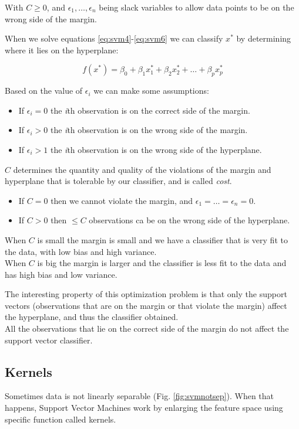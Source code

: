 With $C \ge 0$, and $\epsilon_1, \dots, \epsilon_n$ being slack variables to allow data points to be on the wrong side of the margin.

When we solve equations \ref{eq:svm4}-\ref{eq:svm6} we can classify $x^*$ by determining where it lies on the hyperplane:

\begin{equation} \label{eq:svm7}
f(x^*) = \beta_0 + \beta_1 x_{1}^* + \beta_2 x_{2}^* + \dots + \beta_p x_{p}^*
\end{equation}

Based on the value of $\epsilon_i$ we can make some assumptions:
\begin{itemize}[noitemsep]
	\item If $\epsilon_i = 0$ the \textit{i}th observation is on the correct side of the margin.
	\item If $\epsilon_i > 0$ the \textit{i}th observation is on the wrong side of the margin.
	\item If $\epsilon_i > 1$ the \textit{i}th observation is on the wrong side of the hyperplane.
\end{itemize}

$C$ determines the quantity and quality of the violations of the margin and hyperplane that is tolerable by our classifier, and is called \textit{cost}.
\begin{itemize}[noitemsep]
	\item If $C = 0$ then we cannot violate the margin, and $\epsilon_1 = \dots = \epsilon_n = 0$.
	\item If $C > 0$ then $\le C$ observations ca be on the wrong side of the hyperplane.
\end{itemize} 

When $C$ is small the margin is small and we have a classifier that is very fit to the data, with low bias and high variance. \\
When $C$ is big the margin is larger and the classifier is less fit to the data and has high bias and low variance.

The interesting property of this optimization problem is that only the support vectors (observations that are on the margin or that violate the margin) affect the hyperplane, and thus the classifier obtained. \\
All the observations that lie on the correct side of the margin do not affect the support vector classifier.

\subsection{Kernels}
Sometimes data is not linearly separable (Fig. \ref{fig:svmnotsep}). When that happens, Support Vector Machines work by enlarging the feature space using specific function called kernels.

